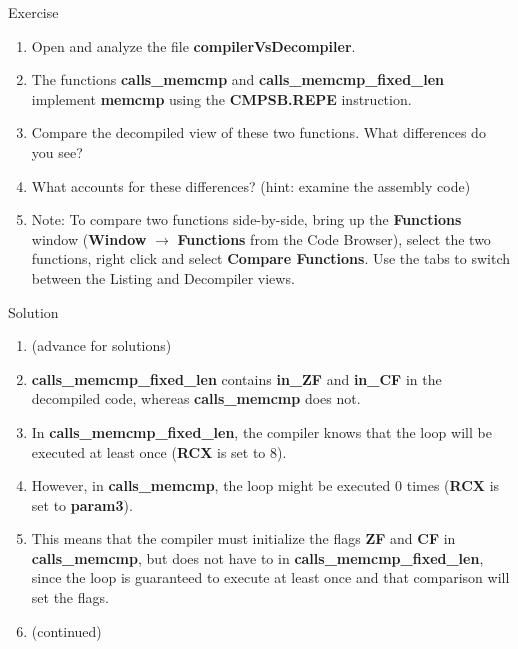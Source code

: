 \documentclass{beamer}
\begin{document}
\begin{frame}
\begin{block}{Exercise}
\begin{enumerate}
\item Open and analyze the file \textbf{compilerVsDecompiler}.
\item The functions \textbf{calls\_memcmp} and \textbf{calls\_memcmp\_fixed\_len} implement \textbf{memcmp} using the \textbf{CMPSB.REPE} instruction.
\item Compare the decompiled view of these two functions.  What differences do you see?
\item What accounts for these differences? (hint: examine the assembly code)
\item Note: To compare two functions side-by-side, bring up the \textbf{Functions} window (\textbf{Window} $\rightarrow$ \textbf{Functions} from the Code Browser), select
the two functions, right click and select \textbf{Compare Functions}.  Use the tabs to switch between the Listing and Decompiler views.
\end{enumerate}
\end{block}
\end{frame}

\begin{frame}
\begin{block}{Solution}
\begin{enumerate}
\item[] (advance for solutions)
\pause
\item \textbf{calls\_memcmp\_fixed\_len} contains \textbf{in\_ZF} and \textbf{in\_CF} in the decompiled code, whereas \textbf{calls\_memcmp} does not.
\item In \textbf{calls\_memcmp\_fixed\_len}, the compiler knows that the loop will be executed at least once (\textbf{RCX} is set to 8).
\item However, in \textbf{calls\_memcmp}, the loop might be executed 0 times (\textbf{RCX} is set to \textbf{param3}).
\item This means that the compiler must initialize the flags \textbf{ZF} and \textbf{CF} in \textbf{calls\_memcmp}, but does not have to in \textbf{calls\_memcmp\_fixed\_len}, since
the loop is guaranteed to execute at least once and that comparison will set the flags.
\item[] (continued)
\end{enumerate}
\end{block}
\end{frame}
\end{document}
